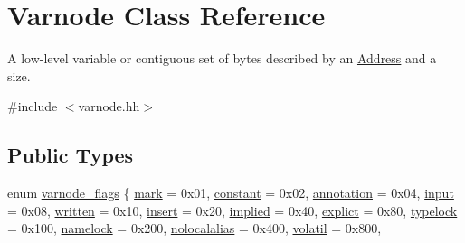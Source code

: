 \hypertarget{class_varnode}{}\section{Varnode Class Reference}
\label{class_varnode}


A low-\/level variable or contiguous set of bytes described by an \mbox{\hyperlink{class_address}{Address}} and a size.  




{\ttfamily \#include $<$varnode.\+hh$>$}

\subsection*{Public Types}
\begin{DoxyCompactItemize}
\item 
enum \mbox{\hyperlink{class_varnode_ad367c0ac3c08b6f41e7334e90a138e8c}{varnode\+\_\+flags}} \{ \newline
\mbox{\hyperlink{class_varnode_ad367c0ac3c08b6f41e7334e90a138e8ca342d968e37003a12f9026a15dda2e8f6}{mark}} = 0x01, 
\mbox{\hyperlink{class_varnode_ad367c0ac3c08b6f41e7334e90a138e8caa3c42d4b456f7dcaa76f7b4f7fa7f5b0}{constant}} = 0x02, 
\mbox{\hyperlink{class_varnode_ad367c0ac3c08b6f41e7334e90a138e8cada11eee7331d13bd3034be76475cedac}{annotation}} = 0x04, 
\mbox{\hyperlink{class_varnode_ad367c0ac3c08b6f41e7334e90a138e8ca9c9363556459d8828a5ab58c370ccd2e}{input}} = 0x08, 
\newline
\mbox{\hyperlink{class_varnode_ad367c0ac3c08b6f41e7334e90a138e8ca16c6748ecb7542c2f79d81be83098dd5}{written}} = 0x10, 
\mbox{\hyperlink{class_varnode_ad367c0ac3c08b6f41e7334e90a138e8ca2b40cdc5083e1a49cd5195d46711e5f5}{insert}} = 0x20, 
\mbox{\hyperlink{class_varnode_ad367c0ac3c08b6f41e7334e90a138e8caa94f6c51e33e8e9732fc45896d586088}{implied}} = 0x40, 
\mbox{\hyperlink{class_varnode_ad367c0ac3c08b6f41e7334e90a138e8ca7261c587f617694d7d4fc11ad193c6f8}{explict}} = 0x80, 
\newline
\mbox{\hyperlink{class_varnode_ad367c0ac3c08b6f41e7334e90a138e8cae49e063a1b1e7de4592afd3f19abbdc7}{typelock}} = 0x100, 
\mbox{\hyperlink{class_varnode_ad367c0ac3c08b6f41e7334e90a138e8ca0b1de824f917f0c708db4fa4b8caaeb8}{namelock}} = 0x200, 
\mbox{\hyperlink{class_varnode_ad367c0ac3c08b6f41e7334e90a138e8ca682ddee1f9b9f32c4d8a69dc53b8bf69}{nolocalalias}} = 0x400, 
\mbox{\hyperlink{class_varnode_ad367c0ac3c08b6f41e7334e90a138e8cafd8f85c37b5ee3374d865cafbaf6f7e5}{volatil}} = 0x800, 
\newline

\end{DoxyCompactItemize}
